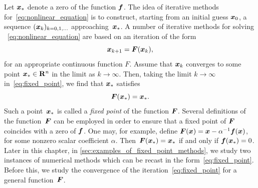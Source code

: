Let $\mathbf{\boldsymbol{x}}_*$ denote a zero of the function $\mathbf{\boldsymbol{f}}$.
The idea of iterative methods for~\eqref{eq:nonlinear_equation} is to construct,
starting from an initial guess $\mathbf{\boldsymbol{x}}_0$,
a sequence $(\mathbf{\boldsymbol{x}}_k)_{k=0, 1, \dotsc}$ approaching~$\mathbf{\boldsymbol{x}}_*$.
A number of iterative methods for solving ~\eqref{eq:nonlinear_equation} are based on an iteration of the form
\begin{equation}
    \label{eq:fixed_point}
    \mathbf{\boldsymbol{x}}_{k+1} = \mathbf{\boldsymbol{F}}(\mathbf{\boldsymbol{x}}_{k}),
\end{equation}
for an appropriate continuous function $F$.
Assume that $\mathbf{\boldsymbol{x}}_k$ converges to some point $\mathbf{\boldsymbol{x}}_* \in \mathbf R^n$ in the limit as $k \to \infty$.
Then, taking the limit $k \to \infty$ in~\eqref{eq:fixed_point},
we find that $\mathbf{\boldsymbol{x}}_*$ satisfies
\[
    \mathbf{\boldsymbol{F}}(\mathbf{\boldsymbol{x}}_*) = \mathbf{\boldsymbol{x}}_*.
\]
Such a point~$\mathbf{\boldsymbol{x}}_*$ is called a \emph{fixed point} of the function $\mathbf{\boldsymbol{F}}$.
Several definitions of the function~$\mathbf{\boldsymbol{F}}$ can be employed in order to ensure that
a fixed point of $\mathbf{\boldsymbol{F}}$ coincides with a zero of $\mathbf{\boldsymbol{f}}$.
One may, for example, define $\mathbf{\boldsymbol{F}}(\mathbf{\boldsymbol{x}}) = \mathbf{\boldsymbol{x}} - \alpha^{-1} \mathbf{\boldsymbol{f}}(\mathbf{\boldsymbol{x}})$,
for some nonzero scalar coefficient $\alpha$.
Then~$\mathbf{\boldsymbol{F}}(\mathbf{\boldsymbol{x}}_*) = \mathbf{\boldsymbol{x}}_*$ if and only if $\mathbf{\boldsymbol{f}}(\mathbf{\boldsymbol{x}}_*) = 0$.
Later in this chapter,
in \cref{sec:examples_of_fixed_point_methods},
we study two instances of numerical methods which can be recast in the form~\eqref{eq:fixed_point}.
Before this,
we study the convergence of the iteration~\eqref{eq:fixed_point} for a general function~$\mathbf{\boldsymbol{F}}$.

